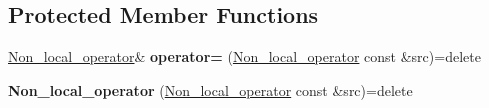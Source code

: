 \subsection*{Protected Member Functions}
\begin{DoxyCompactItemize}
\item 
\hypertarget{classsirius_1_1_non__local__operator_ac74bca0c0211ce0d2b018c767e737de5}{}\hyperlink{classsirius_1_1_non__local__operator}{Non\+\_\+local\+\_\+operator}\& {\bfseries operator=} (\hyperlink{classsirius_1_1_non__local__operator}{Non\+\_\+local\+\_\+operator} const \&src)=delete\label{classsirius_1_1_non__local__operator_ac74bca0c0211ce0d2b018c767e737de5}

\item 
\hypertarget{classsirius_1_1_non__local__operator_a2c239b8b44bd55d3d6c2fc6fe2fde2c6}{}{\bfseries Non\+\_\+local\+\_\+operator} (\hyperlink{classsirius_1_1_non__local__operator}{Non\+\_\+local\+\_\+operator} const \&src)=delete\label{classsirius_1_1_non__local__operator_a2c239b8b44bd55d3d6c2fc6fe2fde2c6}

\end{DoxyCompactItemize}
